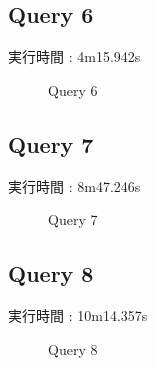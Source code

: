 \documentclass[11pt,a4paper]{jsarticle}
\newlength{\subfigwidth}
\newlength{\subfigcolsep}
\begin{document}
\subsection{Query 6}
実行時間 : 4m15.942s

\begin{figure}[bthp]
 \setlength{\subfigwidth}{.5\linewidth}
 \addtolength{\subfigwidth}{-.5\subfigcolsep}
 \begin{minipage}[b]{\subfigwidth}
 \end{minipage}
 \begin{minipage}[b]{\subfigwidth}
 \end{minipage}
  \caption{Query 6}
  \label{fig:q6}
\end{figure}

\subsection{Query 7}
実行時間 : 8m47.246s

\begin{figure}[bthp]
 \setlength{\subfigwidth}{.5\linewidth}
 \addtolength{\subfigwidth}{-.5\subfigcolsep}
 \begin{minipage}[b]{\subfigwidth}
 \end{minipage}
 \begin{minipage}[b]{\subfigwidth}
 \end{minipage}
  \caption{Query 7}
  \label{fig:q7}
\end{figure}

\subsection{Query 8}
実行時間 : 10m14.357s

\begin{figure}[bthp]
 \setlength{\subfigwidth}{.5\linewidth}
 \addtolength{\subfigwidth}{-.5\subfigcolsep}
 \begin{minipage}[b]{\subfigwidth}
 \end{minipage}
 \begin{minipage}[b]{\subfigwidth}
 \end{minipage}
  \caption{Query 8}
  \label{fig:q8}
\end{figure}
\end{document}
